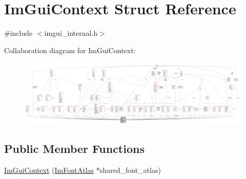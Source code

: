 \hypertarget{structImGuiContext}{}\section{Im\+Gui\+Context Struct Reference}
\label{structImGuiContext}


{\ttfamily \#include $<$imgui\+\_\+internal.\+h$>$}



Collaboration diagram for Im\+Gui\+Context\+:
\nopagebreak
\begin{figure}[H]
\begin{center}
\leavevmode
\includegraphics[width=350pt]{structImGuiContext__coll__graph}
\end{center}
\end{figure}
\subsection*{Public Member Functions}
\begin{DoxyCompactItemize}
\item 
\hyperlink{structImGuiContext_a5842ccae7b18271370b6d5f7f698d8bd}{Im\+Gui\+Context} (\hyperlink{structImFontAtlas}{Im\+Font\+Atlas} $\ast$shared\+\_\+font\+\_\+atlas)
\end{DoxyCompactItemize}
